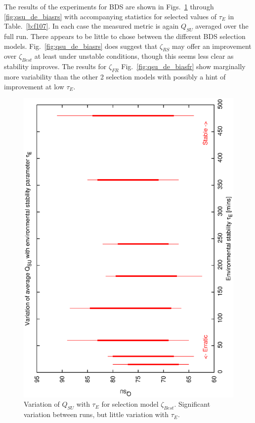 The results of the experiments for BDS are shown in Figs.~\ref{fig:qsu_de_best} through \ref{fig:qsu_de_biasrs} with accompanying statistics for selected values of $\tau_E$ in Table.~\ref{b:f107}. In each case the measured metric is again $Q_{SU}$ averaged over the full run. There appears to be little to chose between the different BDS selection models. Fig.~\ref{fig:qsu_de_biasrs} does suggest that $\zeta_{RS}$ may offer an improvement over $\zeta_{Best}$ at least under unstable conditions, though this seems less clear as stability improves. The results for $\zeta_{FR}$ Fig.~\ref{fig:qsu_de_biasfr} show marginally more variability than the other 2 selection models with possibly a hint of improvement at low $\tau_E$.
 
\begin{figure}[h]

\begin{center}
 \includegraphics[scale=0.5, angle=-90]{figures/best_de.eps}
 \caption[Variation of $Q_{SU}$ with $\tau_E$ for selection model $\zeta_{Best}$.] 
   {Variation of $Q_{SU}$ with $\tau_E$ for selection model $\zeta_{Best}$. Significant variation between runs, but little variation with $\tau_E$.}
\label{fig:qsu_de_best}
\end{center} 
\end{figure}

